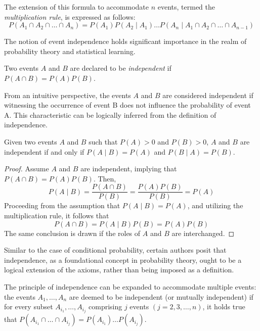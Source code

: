 The extension of this formula to accommodate $n$ events, termed the \emph{multiplication rule}, is expressed as follows:
\[
P \left( A_{1} \cap A_{2} \cap \ldots \cap A_{n} \right) = P \left( A_{1} \right) P \left( A_{2} \mid A_{1}\right) \ldots  P \left( A_{n} \mid A_{1}\cap A_{2} \cap \ldots \cap A_{n-1} \right)
\]

The notion of event independence holds significant importance in the realm of probability theory and statistical learning. 

\begin{definition}\label{independent_events}
Two events $A$ and $B$ are declared to be \emph{independent} if $P \left( A \cap B \right) = P \left( A \right) P \left(B \right)$.
\end{definition}

From an intuitive perspective, the events $A$ and $B$ are considered independent if witnessing the occurrence of event B does not influence the probability of event A. This characteristic can be logically inferred from the definition of independence.

\begin{proposition}
Given two events $A$ and $B$ such that $P \left( A \right) > 0$ and $P \left( B \right)>0$, $A$ and $B$ are independent if and only if $P \left( A \mid B\right) = P \left( A \right)$ and $P \left( B \mid  A \right) = P \left( B \right)$.
\end{proposition}
\begin{proof}
Assume $A$ and $B$ are independent, implying that $P \left( A \cap B \right) = P \left( A \right) P \left(B \right)$. Then,
\[
P \left( A \mid B \right) = \frac{P\left(A\cap B\right)}{P\left(B\right)} = \frac{P \left( A \right) P \left(B \right)}{P\left(B\right)} = P \left( A \right)
\]
Proceeding from the assumption that $P \left( A \mid B \right) = P \left( A \right)$, and utilizing the multiplication rule, it follows that
\[
P \left( A \cap B \right) =  P \left( A \mid B \right) P \left( B \right) = P \left( A \right) P \left( B \right)
\] 
The same conclusion is drawn if the roles of $A$ and $B$ are interchanged.
\end{proof}

Similar to the case of conditional probability, certain authors posit that independence, as a foundational concept in probability theory, ought to be a logical extension of the axioms, rather than being imposed as a definition.

The principle of independence can be expanded to accommodate multiple events: the events $A_{1}, \ldots, A_{n}$ are deemed to be independent (or mutually independent) if for every subset $A_{i_1}, \ldots, A_{i_j}$ comprising $j$ events $\left( j = 2, 3, \ldots, n \right)$, it holds true that $P \left( A_{i_1} \cap \ldots \cap A_{i_j} \right) = P \left( A_{i_1} \right) \ldots P \left( A_{i_j}\right)$.

